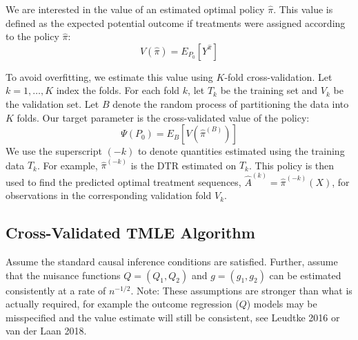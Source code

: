 \documentclass{article}
\begin{document}
	We are interested in the value of an estimated optimal policy \(\widehat{\pi}\). This value is defined as the expected potential outcome if treatments were assigned according to the policy \(\widehat{\pi}\):
	\[
		V(\widehat{\pi}) = E_{P_0}[Y^{\widehat{\pi}}]
	\]

	To avoid overfitting, we estimate this value using \(K\)-fold cross-validation. Let \(k=1,\dots,K\) index the folds. For each fold \(k\), let \(T_k\) be the training set and \(V_k\) be the validation set. Let \(B\) denote the random process of partitioning the data into \(K\) folds. Our target parameter is the cross-validated value of the policy:
	\[
		\Psi(P_0) = E_B[V(\widehat{\pi}^{(B)})]
	\]
	We use the superscript \((-k)\) to denote quantities estimated using the training data \(T_k\). For example, \(\widehat{\pi}^{(-k)}\) is the DTR estimated on \(T_k\). This policy is then used to find the predicted optimal treatment sequences, \(\widehat{A}^{(k)} = \widehat{\pi}^{(-k)}(X)\), for observations in the corresponding validation fold \(V_k\).

	\subsection*{Cross-Validated TMLE Algorithm}

	Assume the standard causal inference conditions are satisfied. Further, assume that the nuisance functions \(Q=(Q_1, Q_2)\) and \(g=(g_1, g_2)\) can be estimated consistently at a rate of \(n^{-1/2}\). Note: These assumptions are stronger than what is actually required, for example the outcome regression (\(Q\)) models may be misspecified and the value estimate will still be consistent, see Leudtke 2016 or van der Laan 2018.
\end{document}
